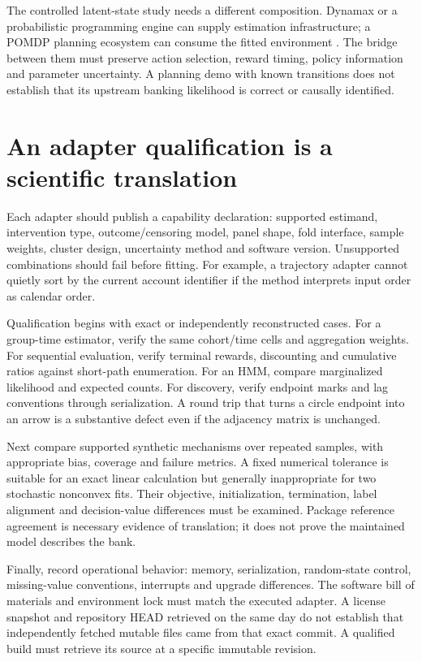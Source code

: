 The controlled latent-state study needs a different composition.
Dynamax or a probabilistic programming engine can supply estimation
infrastructure; a POMDP planning ecosystem can consume the fitted
environment \citep{sw_dynamax,sw_pymc,sw_numpyro,sw_pomdps,sw_pomdp_py}.
The bridge between them must preserve action selection, reward timing,
policy information and parameter uncertainty. A planning demo with known
transitions does not establish that its upstream banking likelihood is
correct or causally identified.

\section{An adapter qualification is a scientific translation}
Each adapter should publish a capability declaration: supported estimand,
intervention type, outcome/censoring model, panel shape, fold interface,
sample weights, cluster design, uncertainty method and software version.
Unsupported combinations should fail before fitting. For example, a
trajectory adapter cannot quietly sort by the current account identifier
if the method interprets input order as calendar order.

Qualification begins with exact or independently reconstructed cases.
For a group-time estimator, verify the same cohort/time cells and
aggregation weights. For sequential evaluation, verify terminal rewards,
discounting and cumulative ratios against short-path enumeration. For an
HMM, compare marginalized likelihood and expected counts. For discovery,
verify endpoint marks and lag conventions through serialization. A round
trip that turns a circle endpoint into an arrow is a substantive defect
even if the adjacency matrix is unchanged.

Next compare supported synthetic mechanisms over repeated samples, with
appropriate bias, coverage and failure metrics. A fixed numerical tolerance
is suitable for an exact linear calculation but generally inappropriate
for two stochastic nonconvex fits. Their objective, initialization,
termination, label alignment and decision-value differences must be
examined. Package reference agreement is necessary evidence of translation;
it does not prove the maintained model describes the bank.

Finally, record operational behavior: memory, serialization, random-state
control, missing-value conventions, interrupts and upgrade differences.
The software bill of materials and environment lock must match the
executed adapter. A license snapshot and repository HEAD retrieved on the
same day do not establish that independently fetched mutable files came
from that exact commit. A qualified build must retrieve its source at a
specific immutable revision.

